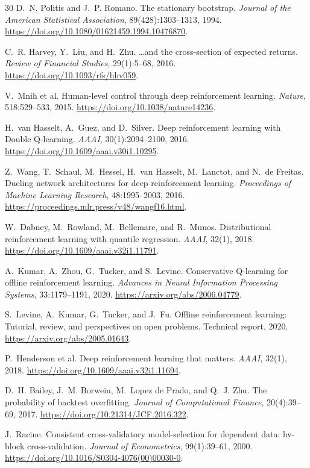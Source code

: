 \documentclass[10pt,letterpaper]{article}
\numberwithin{equation}{section}
\theoremstyle{definition}
\theoremstyle{remark}
\begin{document}
\begin{thebibliography}{30}
D.~N. Politis and J.~P. Romano.
\newblock The stationary bootstrap.
\newblock \emph{Journal of the American Statistical Association},
89(428):1303--1313, 1994.
\newblock \url{https://doi.org/10.1080/01621459.1994.10476870}.

C.~R. Harvey, Y.~Liu, and H.~Zhu.
\newblock \ldots and the cross-section of expected returns.
\newblock \emph{Review of Financial Studies}, 29(1):5--68, 2016.
\newblock \url{https://doi.org/10.1093/rfs/hhv059}.

V.~Mnih et al.
\newblock Human-level control through deep reinforcement learning.
\newblock \emph{Nature}, 518:529--533, 2015.
\newblock \url{https://doi.org/10.1038/nature14236}.

H.~van Hasselt, A.~Guez, and D.~Silver.
\newblock Deep reinforcement learning with Double Q-learning.
\newblock \emph{AAAI}, 30(1):2094--2100, 2016.
\newblock \url{https://doi.org/10.1609/aaai.v30i1.10295}.

Z.~Wang, T.~Schaul, M.~Hessel, H.~van Hasselt, M.~Lanctot, and N.~de Freitas.
\newblock Dueling network architectures for deep reinforcement learning.
\newblock \emph{Proceedings of Machine Learning Research}, 48:1995--2003, 2016.
\newblock \url{https://proceedings.mlr.press/v48/wangf16.html}.

W.~Dabney, M.~Rowland, M.~Bellemare, and R.~Munos.
\newblock Distributional reinforcement learning with quantile regression.
\newblock \emph{AAAI}, 32(1), 2018.
\newblock \url{https://doi.org/10.1609/aaai.v32i1.11791}.

A.~Kumar, A.~Zhou, G.~Tucker, and S.~Levine.
\newblock Conservative Q-learning for offline reinforcement learning.
\newblock \emph{Advances in Neural Information Processing Systems},
33:1179--1191, 2020.
\newblock \url{https://arxiv.org/abs/2006.04779}.

S.~Levine, A.~Kumar, G.~Tucker, and J.~Fu.
\newblock Offline reinforcement learning: Tutorial, review, and perspectives on
open problems.
\newblock Technical report, 2020.
\newblock \url{https://arxiv.org/abs/2005.01643}.

P.~Henderson et al.
\newblock Deep reinforcement learning that matters.
\newblock \emph{AAAI}, 32(1), 2018.
\newblock \url{https://doi.org/10.1609/aaai.v32i1.11694}.

D.~H. Bailey, J.~M. Borwein, M.~Lopez de Prado, and Q.~J. Zhu.
\newblock The probability of backtest overfitting.
\newblock \emph{Journal of Computational Finance}, 20(4):39--69, 2017.
\newblock \url{https://doi.org/10.21314/JCF.2016.322}.

J.~Racine.
\newblock Consistent cross-validatory model-selection for dependent data:
hv-block cross-validation.
\newblock \emph{Journal of Econometrics}, 99(1):39--61, 2000.
\newblock \url{https://doi.org/10.1016/S0304-4076(00)00030-0}.

\end{thebibliography}
\end{document}
